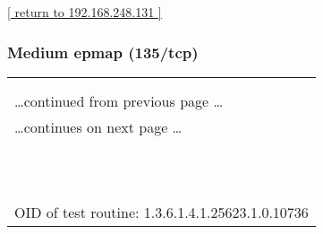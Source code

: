 \documentclass{article}
\begin{document}
\begin{footnotesize}\hyperref[host:192.168.248.131]{[ return to 192.168.248.131 ]}\end{footnotesize}
\subsubsection{Medium epmap (135/tcp)}
\label{port:192.168.248.131 epmap (135/tcp) Medium}

\begin{longtable}{|p{}|}
\hline
\rowcolor{openvas_warning}{\color{white}{Medium (CVSS: 5.0) }}\\
\rowcolor{openvas_warning}{\color{white}{NVT: DCE Services Enumeration}}\\
\hline
\endfirsthead
\hfill\ldots continued from previous page \ldots \\
\hline
\endhead
\hline
\ldots continues on next page \ldots \\
\endfoot
\hline
\endlastfoot
\\
\rowcolor{white}{\verb=  Summary:=}\\
\rowcolor{white}{\verb=  Distributed Computing Environment (DCE) services running on the remote host =}\\
\rowcolor{white}{\verb=can be enumerated by connecting on port 135 and doing the appropriate queries. =}\\
\rowcolor{white}{\verb=An attacker may use this fact to gain more knowledge=}\\
\rowcolor{white}{\verb=about the remote host.=}\\
\rowcolor{white}{\verb=  Solution:=}\\
\rowcolor{white}{\verb=  filter incoming traffic to this port.=}\\
\rowcolor{white}{\verb==}\\
\rowcolor{white}{\verb==}\\
\\
OID of test routine: 1.3.6.1.4.1.25623.1.0.10736\\
\end{longtable}
\end{document}
